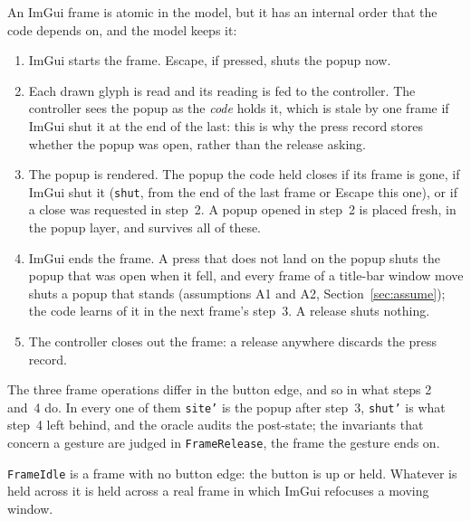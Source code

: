 \documentclass[a4paper,10pt,fleqn]{article}
\begin{document}
An ImGui frame is atomic in the model, but it has an internal order that the
code depends on, and the model keeps it:
\begin{enumerate}
  \item ImGui starts the frame.  Escape, if pressed, shuts the popup now.
  \item Each drawn glyph is read and its reading is fed to the controller.  The
    controller sees the popup as the \emph{code} holds it, which is stale by
    one frame if ImGui shut it at the end of the last: this is why the press
    record stores whether the popup was open, rather than the release asking.
  \item The popup is rendered.  The popup the code held closes if its frame is
    gone, if ImGui shut it (\texttt{shut}, from the end of the last frame or
    Escape this one), or if a close was requested in step~2.  A popup opened in
    step~2 is placed fresh, in the popup layer, and survives all of these.
  \item ImGui ends the frame.  A press that does not land on the popup shuts
    the popup that was open when it fell, and every frame of a title-bar window
    move shuts a popup that stands (assumptions A1 and A2,
    Section~\ref{sec:assume}); the code learns of it in the next frame's
    step~3.  A release shuts nothing.
  \item The controller closes out the frame: a release anywhere discards the
    press record.
\end{enumerate}
The three frame operations differ in the button edge, and so in what steps 2
and~4 do.  In every one of them \texttt{site'} is the popup after step~3,
\texttt{shut'} is what step~4 left behind, and the oracle audits the
post-state; the invariants that concern a gesture are judged in
\texttt{FrameRelease}, the frame the gesture ends on.

\texttt{FrameIdle} is a frame with no button edge: the button is up or held.
Whatever is held across it is held across a real frame in which ImGui
refocuses a moving window.
\end{document}
